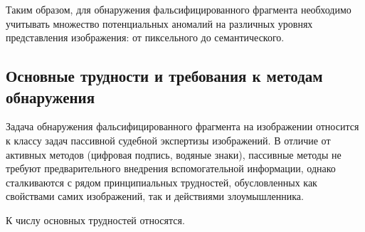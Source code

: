 Таким образом, для обнаружения фальсифицированного фрагмента необходимо учитывать множество потенциальных аномалий на различных уровнях представления изображения: от пиксельного до семантического.

\subsection{Основные трудности и требования к методам обнаружения}

Задача обнаружения фальсифицированного фрагмента на изображении относится к классу задач пассивной судебной экспертизы изображений. В отличие от активных методов (цифровая подпись, водяные знаки), пассивные методы не требуют предварительного внедрения вспомогательной информации, однако сталкиваются с рядом принципиальных трудностей, обусловленных как свойствами самих изображений, так и действиями злоумышленника\cite{6}.

К числу основных трудностей относятся.


